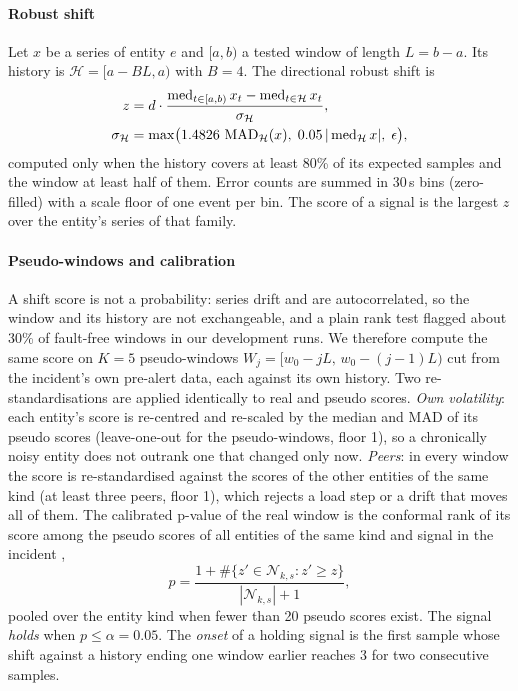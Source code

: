 \paragraph{Robust shift}
Let $x$ be a series of entity $e$ and $[a,b)$ a tested window of length $L=b-a$. Its history is $\mathcal{H}=[a-BL,a)$ with $B=4$.
The directional robust shift is
\begin{equation}\label{eq:shift}
\begin{aligned}
z &= d\cdot\frac{\operatorname{med}_{t\in[a,b)} x_t-\operatorname{med}_{t\in\mathcal{H}} x_t}{\sigma_{\mathcal{H}}},\\
\sigma_{\mathcal{H}} &= \max\!\big(1.4826\,\operatorname{MAD}_{\mathcal{H}}(x),\;0.05\,|\operatorname{med}_{\mathcal{H}} x|,\;\epsilon\big),
\end{aligned}
\end{equation}
computed only when the history covers at least 80\% of its expected samples and the window at least half of them. Error counts are
summed in 30\,s bins (zero-filled) with a scale floor of one event per bin. The score of a signal is the largest $z$ over the
entity's series of that family.

\paragraph{Pseudo-windows and calibration}
A shift score is not a probability: series drift and are autocorrelated, so the window and its history are not exchangeable, and a
plain rank test flagged about 30\% of fault-free windows in our development runs. We therefore compute the same score on $K=5$
pseudo-windows $W_j=[w_0-jL,\,w_0-(j-1)L)$ cut from the incident's own pre-alert data, each against its own history. Two
re-standardisations are applied identically to real and pseudo scores. \emph{Own volatility}: each entity's score is re-centred and
re-scaled by the median and MAD of its pseudo scores (leave-one-out for the pseudo-windows, floor 1), so a chronically noisy entity
does not outrank one that changed only now. \emph{Peers}: in every window the score is re-standardised against the scores of the
other entities of the same kind (at least three peers, floor 1), which rejects a load step or a drift that moves all of them. The
calibrated p-value of the real window is the conformal rank of its score among the pseudo scores of all entities of the same kind
and signal in the incident \citep{efron2004null,vovk2005conformal},
\begin{equation}\label{eq:pvalue}
p = \frac{1+\#\{z'\in\mathcal{N}_{k,s}: z'\geq z\}}{|\mathcal{N}_{k,s}|+1},
\end{equation}
pooled over the entity kind when fewer than 20 pseudo scores exist. The signal \emph{holds} when $p\leq\alpha=0.05$. The
\emph{onset} of a holding signal is the first sample whose shift against a history ending one window earlier reaches 3 for two
consecutive samples.

